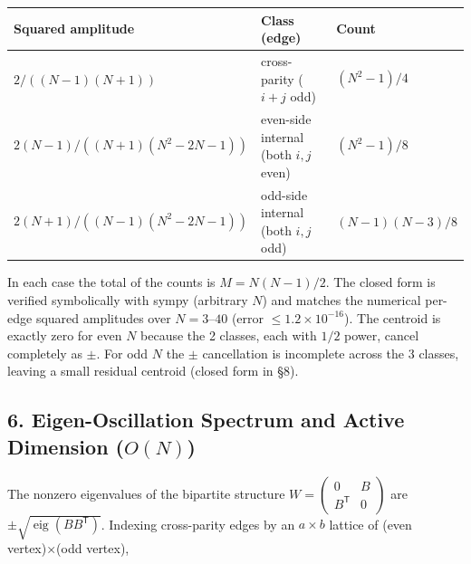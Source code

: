 \documentclass[
  a4paper,
]{ltjsarticle}
\newcounter{none} %
\begin{document}
{\def\LTcaptype{none} %
\begin{longtable}[]{@{}
  >{\raggedright\arraybackslash}p{}
  >{\raggedright\arraybackslash}p{}
  >{\raggedright\arraybackslash}p{}@{}}
\toprule\noalign{}
\begin{minipage}[b]{\linewidth}\raggedright
Squared amplitude
\end{minipage} & \begin{minipage}[b]{\linewidth}\raggedright
Class (edge)
\end{minipage} & \begin{minipage}[b]{\linewidth}\raggedright
Count
\end{minipage} \\
\midrule\noalign{}
\endhead
\bottomrule\noalign{}
\endlastfoot
\(2/((N-1)(N+1))\) & cross-parity (\(i+j\) odd) & \((N^2-1)/4\) \\
\(2(N-1)/((N+1)(N^2-2N-1))\) & even-side internal (both \(i,j\) even) &
\((N^2-1)/8\) \\
\(2(N+1)/((N-1)(N^2-2N-1))\) & odd-side internal (both \(i,j\) odd) &
\((N-1)(N-3)/8\) \\
\end{longtable}
}

In each case the total of the counts is \(M=N(N-1)/2\). The closed form
is verified symbolically with sympy (arbitrary \(N\)) and matches the
numerical per-edge squared amplitudes over \(N=3\)--\(40\) (error
\(\le1.2\times10^{-16}\)). The centroid is exactly zero for even \(N\)
because the 2 classes, each with \(1/2\) power, cancel completely as
\(\pm\). For odd \(N\) the \(\pm\) cancellation is incomplete across the
3 classes, leaving a small residual centroid (closed form in §8).

\subsection{\texorpdfstring{6. Eigen-Oscillation Spectrum and Active
Dimension
(\(O(N)\))}{6. Eigen-Oscillation Spectrum and Active Dimension (O(N))}}\label{eigen-oscillation-spectrum-and-active-dimension-on}

The nonzero eigenvalues of the bipartite structure
\(W=\begin{pmatrix}0&B\\B^{\mathsf T}&0\end{pmatrix}\) are
\(\pm\sqrt{\operatorname{eig}(BB^{\mathsf T})}\). Indexing cross-parity
edges by an \(a\times b\) lattice of (even vertex)×(odd vertex),
\end{document}
